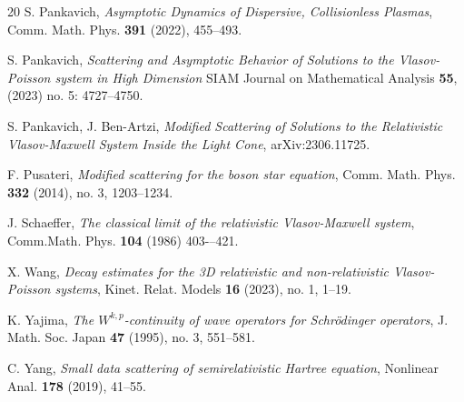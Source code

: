 \documentclass[reqno, 11pt, letterpaper]{amsart}
\theoremstyle{remark}
\numberwithin{equation}{section}
\numberwithin{theorem}{section}
\numberwithin{table}{section}
\numberwithin{figure}{section}
\begin{document}
\begin{thebibliography}{20}
 S. Pankavich,
\emph{Asymptotic Dynamics of Dispersive, Collisionless Plasmas}, Comm. Math. Phys. \textbf{391} (2022), 455--493.

 S. Pankavich,
\emph{Scattering and Asymptotic Behavior of Solutions to the Vlasov-Poisson system in High Dimension} SIAM Journal on Mathematical Analysis \textbf{55}, (2023) no. 5: 4727–4750.

 S. Pankavich, J. Ben-Artzi, \emph{Modified Scattering of Solutions to the Relativistic Vlasov-Maxwell System Inside the Light Cone}, 	arXiv:2306.11725.

 F. Pusateri, \emph{Modified scattering for the boson star equation}, Comm. Math. Phys. \textbf{332} (2014), no. 3, 1203--1234.

 J. Schaeffer, \emph{The classical limit of the relativistic Vlasov-Maxwell system}, Comm.Math. Phys. \textbf{104} (1986) 403-–421.

 X. Wang, \emph{Decay estimates for the  3D  relativistic and non-relativistic Vlasov-Poisson systems}, Kinet. Relat. Models \textbf{16} (2023), no. 1, 1--19.

 K. Yajima, \emph{The $W^{k,p}$-continuity of wave operators for Schrödinger operators}, J. Math. Soc. Japan \textbf{47} (1995), no. 3, 551--581.

 C. Yang, \emph{Small data scattering of semirelativistic Hartree equation}, Nonlinear Anal. \textbf{178} (2019), 41--55.

\end{thebibliography}
\end{document}
